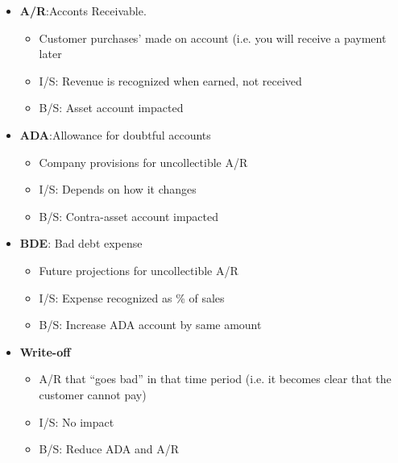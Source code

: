 \begin{itemize}[noitemsep,topsep=0pt]
	\item \textbf{A/R}:Acconts Receivable.
	\begin{itemize}[noitemsep,topsep=0pt]
		\item Customer purchases' made on account (i.e. you will receive a payment later
		\item I/S: Revenue is recognized when earned, not received
		\item B/S: Asset account impacted 
	\end{itemize}
	\item \textbf{ADA}:Allowance for doubtful accounts 
	\begin{itemize}[noitemsep,topsep=0pt]
		\item Company provisions for uncollectible A/R
		\item I/S: Depends on how it changes
		\item B/S: Contra-asset account impacted
	\end{itemize}
	\item \textbf{BDE}: Bad debt expense
	\begin{itemize}[noitemsep,topsep=0pt]
		\item Future projections for uncollectible A/R
		\item I/S: Expense recognized as \% of sales
		\item B/S: Increase ADA account by same amount
	\end{itemize}
	\item \textbf{Write-off}
	\begin{itemize}[noitemsep,topsep=0pt]
		\item A/R that “goes bad” in that time period (i.e. it becomes clear that the customer cannot pay)
		\item  I/S: No impact
		\item  B/S: Reduce ADA and A/R
	\end{itemize}
	
\end{itemize}
